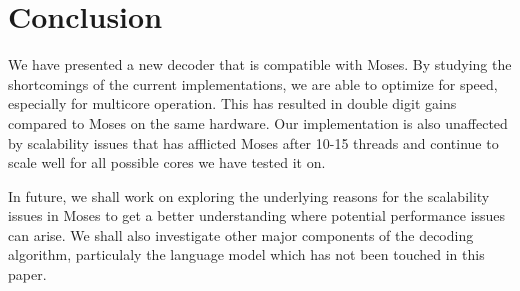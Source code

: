 \documentclass[11pt]{article}
\begin{document}
\section{Conclusion}

We have presented a new decoder that is compatible with Moses. By studying the shortcomings of the current implementations, we are able to optimize for speed, especially for multicore operation. This has resulted in double digit gains compared to Moses on the same hardware. Our implementation is also unaffected by scalability issues that has afflicted Moses after 10-15 threads and continue to scale well for all possible cores we have tested it on.

In future, we shall work on exploring the underlying reasons for the scalability issues in Moses to get a better understanding where potential performance issues can arise. We shall also investigate other major components of the decoding algorithm, particulaly the language model which has not been touched in this paper.

% 



\end{document}
